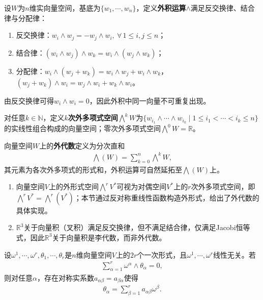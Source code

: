 \documentclass[../../main.tex]{subfiles}%
\begin{document}
\begin{definition}
设$W$为$n$维实向量空间，基底为$\{w_1,\cdots,w_n\}$，定义\textbf{外积运算}$\land$满足反交换律、结合律与分配律：
\begin{enumerate}[(1)]
\item 反交换律：$w_i\land w_j = -w_j\land w_i,\ \forall\,1\leqslant i,j\leqslant n$；
\item 结合律：$(w_i\land w_j)\land w_k = w_i\land(w_j\land w_k)$；
\item 分配律：$w_i\land(w_j+w_k)=w_i\land w_j+w_i\land w_k$，$(w_j+w_k)\land w_i=w_j\land w_i+w_k\land w_i$。
\end{enumerate}
由反交换律可得$w_i\land w_i=0$，因此外积中同一向量不可重复出现。

对任意$k\in\mathbb{N}$，定义\textbf{$k$次外多项式空间}$\bigwedge^k W$为$\{w_{i_1}\land\cdots\land w_{i_k}\mid 1\leqslant i_1<\cdots<i_k\leqslant n\}$的实线性组合构成的向量空间；零次外多项式空间$\bigwedge^0 W=\mathbb{R}$。

向量空间$W$上的\textbf{外代数}定义为分次直和
\begin{align*}
\bigwedge(W) = \sum\limits_{k=0}^n \bigwedge^k W,
\end{align*}
其元素为各次外多项式的形式和，外积运算可自然延拓至$\bigwedge(W)$上。
\end{definition}

\begin{remark}
\begin{enumerate}[(1)]
\item 向量空间$V$上的外形式空间$\bigwedge^r V^*$可视为对偶空间$V^*$上的$r$次外多项式空间，即$\bigwedge^r V^*=\bigwedge^r(V^*)$；本节通过反对称重线性函数构造外形式，给出了外代数的具体实现。
\item $\mathbb{R}^3$关于向量积（叉积）满足反交换律，但不满足结合律，仅满足Jacobi恒等式，因此$\mathbb{R}^3$关于向量积是李代数，而非外代数。
\end{enumerate}
\end{remark}

\begin{theorem}
设$\omega^1,\cdots,\omega^r,\theta_1,\cdots,\theta_r$是$n$维向量空间$V$上的$2r$个一次形式，且$\omega^1,\cdots,\omega^r$线性无关。若
\begin{align}
\sum\limits_{\alpha=1}^r \omega^\alpha\land\theta_\alpha=0, \label{eq:cartan-identity}
\end{align}
则对任意$\alpha$，存在对称实系数$a_{\alpha\beta}=a_{\beta\alpha}$使得
\begin{align*}
\theta_\alpha = \sum\limits_{\beta=1}^r a_{\alpha\beta}\omega^\beta.
\end{align*}
\end{theorem}
\end{document}
